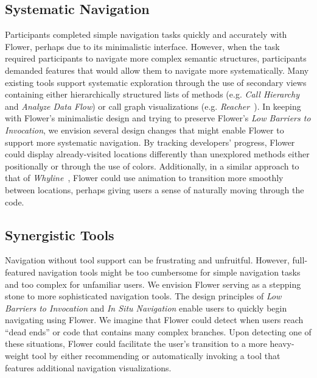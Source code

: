 \documentclass[conference]{IEEEtran}
\begin{document}
\subsection{Systematic Navigation}
Participants completed simple navigation tasks quickly and accurately with Flower, perhaps due to its minimalistic interface.
However, when the task required participants to navigate more complex semantic structures, participants demanded features that would allow them to navigate more systematically.
Many existing tools support systematic exploration through the use of secondary views containing either hierarchically structured lists of methods (e.g. \textit{Call Hierarchy} and \textit{Analyze Data Flow}) or call graph visualizations (e.g. \textit{Reacher~\cite{Reacher}}).
In keeping with Flower's minimalistic design and trying to preserve Flower's \textit{Low Barriers to Invocation}, we envision several design changes that might enable Flower  to support more systematic navigation.
By tracking developers' progress, Flower  could display already-visited locations differently than unexplored methods either positionally or through the use of colors.
Additionally, in a similar approach to that of \emph{Whyline}~\cite{Whyline}, Flower  could use animation to transition more smoothly between locations, perhaps giving users a sense of naturally moving through the code.


\subsection{Synergistic Tools}
Navigation without tool support can be frustrating and unfruitful.
However, full-featured navigation tools might be too cumbersome for simple navigation tasks and too complex for unfamiliar users.
We envision Flower  serving as a stepping stone to more sophisticated navigation tools. 
The design principles of \textit{Low Barriers to Invocation} and \textit{In Situ Navigation} enable users to quickly begin navigating using Flower. 
We imagine that Flower  could detect when users reach ``dead ends'' or code that contains many complex branches.
Upon detecting one of these situations, Flower  could facilitate the user's transition to a more heavy-weight tool by either recommending or automatically invoking a tool that features additional navigation visualizations.
\end{document}
